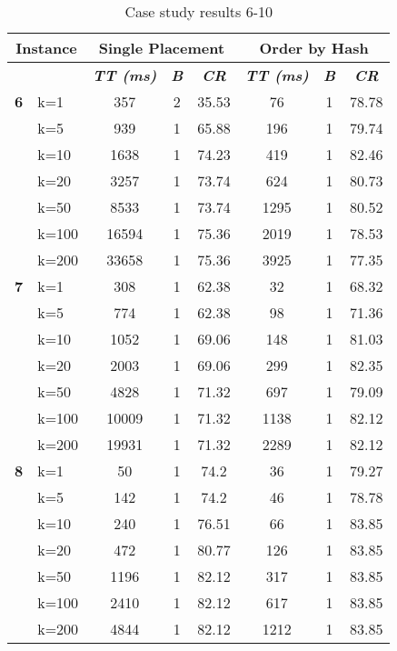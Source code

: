     \begin{table}[htbp]
    \caption{Case study results 6-10}
    \centering
    \begin{tabular}{|l|l|c|c|c|c|c|c|}
    \hline
    \multicolumn{ 2}{|c|}{\textbf{Instance}} & \multicolumn{ 3}{c|}{\textbf{Single Placement}} & \multicolumn{ 3}{c|}{\textbf{Order by Hash}} \\ \hline
    \multicolumn{ 2}{|l|}{} & \textbf{\textit{TT (ms)}} & \textbf{\textit{B}} & \textbf{\textit{CR}} & \textbf{\textit{TT (ms)}} & \textbf{\textit{B}} & \textbf{\textit{CR}} \\ \hline
    \multicolumn{1}{|r|}{\textbf{6}} & k=1 & 357 & 2 & 35.53 & 76 & 1 & 78.78 \\ 
     & k=5 & 939 & 1 & 65.88 & 196 & 1 & 79.74 \\ 
     & k=10 & 1638 & 1 & 74.23 & 419 & 1 & 82.46 \\ 
     & k=20 & 3257 & 1 & 73.74 & 624 & 1 & 80.73 \\ 
     & k=50 & 8533 & 1 & 73.74 & 1295 & 1 & 80.52 \\ 
     & k=100 & 16594 & 1 & 75.36 & 2019 & 1 & 78.53 \\ 
     & k=200 & 33658 & 1 & 75.36 & 3925 & 1 & 77.35 \\ \hline
    \multicolumn{1}{|r|}{\textbf{7}} & k=1 & 308 & 1 & 62.38 & 32 & 1 & 68.32 \\ 
     & k=5 & 774 & 1 & 62.38 & 98 & 1 & 71.36 \\ 
     & k=10 & 1052 & 1 & 69.06 & 148 & 1 & 81.03 \\ 
     & k=20 & 2003 & 1 & 69.06 & 299 & 1 & 82.35 \\ 
     & k=50 & 4828 & 1 & 71.32 & 697 & 1 & 79.09 \\ 
     & k=100 & 10009 & 1 & 71.32 & 1138 & 1 & 82.12 \\ 
     & k=200 & 19931 & 1 & 71.32 & 2289 & 1 & 82.12 \\ \hline
    \multicolumn{1}{|r|}{\textbf{8}} & k=1 & 50 & 1 & 74.2 & 36 & 1 & 79.27 \\ 
     & k=5 & 142 & 1 & 74.2 & 46 & 1 & 78.78 \\ 
     & k=10 & 240 & 1 & 76.51 & 66 & 1 & 83.85 \\ 
     & k=20 & 472 & 1 & 80.77 & 126 & 1 & 83.85 \\ 
     & k=50 & 1196 & 1 & 82.12 & 317 & 1 & 83.85 \\ 
     & k=100 & 2410 & 1 & 82.12 & 617 & 1 & 83.85 \\ 
     & k=200 & 4844 & 1 & 82.12 & 1212 & 1 & 83.85 \\ \hline

\end{tabular}
\end{table}
